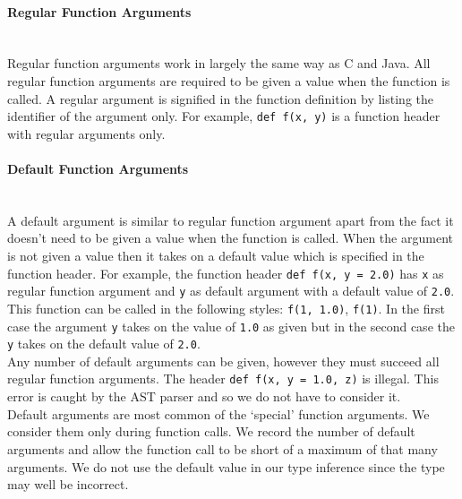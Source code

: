 \documentclass[12pt, titlepage]{article}
\begin{document}
\paragraph*{Regular Function Arguments}\mbox{} \\
Regular function arguments work in largely the same way as C and Java. All regular function arguments are required to be given a value when the function is called. A regular argument is signified in the function definition by listing the identifier of the argument only. For example, \texttt{def f(x, y)} is a function header with regular arguments only.

\paragraph*{Default Function Arguments}\mbox{} \\
A default argument is similar to regular function argument apart from the fact it doesn't need to be given a value when the function is called. When the argument is not given a value then it takes on a default value which is specified in the function header. For example, the function header \texttt{def f(x, y = 2.0)} has \texttt{x} as regular function argument and \texttt{y} as default argument with a default value of \texttt{2.0}. This function can be called in the following styles: \texttt{f(1, 1.0)}, \texttt{f(1)}. In the first case the argument \texttt{y} takes on the value of \texttt{1.0} as given but in the second case the \texttt{y} takes on the default value of \texttt{2.0}. \\
\indent Any number of default arguments can be given, however they must succeed all regular function arguments. The header \texttt{def f(x, y = 1.0, z)} is illegal. This error is caught by the AST parser and so we do not have to consider it. \\
\indent Default arguments are most common of the `special' function arguments. We consider them only during function calls. We record the number of default arguments and allow the function call to be short of a maximum of that many arguments. We do not use the default value in our type inference since the type may well be incorrect. \\
\end{document}
